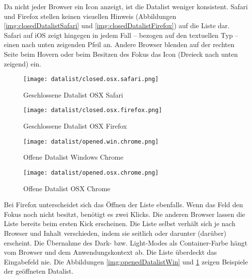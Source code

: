 Da nicht jeder Browser ein Icon anzeigt, ist die Datalist weniger konsistent. 
Safari und Firefox stellen keinen visuellen Hinweis (Abbildungen \ref{img:closedDatalistSafari} und \ref{img:closedDatalistFirefox}) auf die Liste dar.
Safari auf iOS zeigt hingegen in jedem Fall – bezogen auf den textuellen Typ – einen nach unten zeigenden Pfeil an. 
Andere Browser blenden auf der rechten Seite beim Hovern oder beim Besitzen des Fokus das Icon (Dreieck nach unten zeigend) ein. 

\begin{figure}[!htb]
    \centering
    \begin{minipage}[b]{0.25\textwidth}
        \centering
        \begin{minipage}[t]{\textwidth}
            \centering
            \texttt{[image: datalist/closed.osx.safari.png]}
            \caption{\centering Geschlossene Datalist OSX Safari}
            \label{img:closedDatalistSafari}
        \end{minipage}
        \vspace{0.6cm}\newline
        \begin{minipage}[b]{\textwidth}
            \centering
            \texttt{[image: datalist/closed.osx.firefox.png]}
            \caption{\centering Geschlossene Datalist OSX Firefox}
            \label{img:closedDatalistFirefox}
        \end{minipage}
    \end{minipage}
    \hfill
    \begin{minipage}[b]{0.37\textwidth}
        \centering
        \texttt{[image: datalist/opened.win.chrome.png]}
        \caption{\centering Offene Datalist Windows Chrome}
        \label{img:openedDatalistWin}
    \end{minipage}
    \hfill
    \begin{minipage}[b]{0.28\textwidth}
        \centering
        \texttt{[image: datalist/opened.osx.chrome.png]}
        \caption{\centering Offene Datalist OSX Chrome}
        \label{img:openedDatalistOsx}
    \end{minipage}
\end{figure}

Bei Firefox unterscheidet sich das Öffnen der Liste ebenfalls. 
Wenn das Feld den Fokus noch nicht besitzt, benötigt es zwei Klicks. 
Die anderen Browser lassen die Liste bereits beim ersten Kick erscheinen. 
Die Liste selbst verhält sich je nach Browser und Inhalt verschieden, indem sie seitlich oder darunter (darüber) erscheint. 
Die Übernahme des Dark- bzw. Light-Modes als Container-Farbe hängt vom Browser und dem Anwendungskontext ab.
Die Liste überdeckt das Eingabefeld nie. 
Die Abbildungen \ref{img:openedDatalistWin} und \ref{img:openedDatalistOsx} zeigen Beispiele der geöffneten Datalist. 

